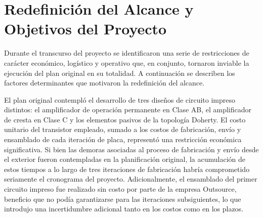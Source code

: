 \chapter{Redefinición del Alcance y Objetivos del Proyecto} \label{sec:alcance}
Durante el transcurso del proyecto se identificaron una serie de restricciones de carácter económico, logístico y operativo que, en conjunto, tornaron inviable la ejecución del plan original en su totalidad. A continuación se describen los factores determinantes que motivaron la redefinición del alcance.

El plan original contempló el desarrollo de tres diseños de circuito impreso distintos: el amplificador de operación permanente en Clase AB, el amplificador de cresta en Clase C y los elementos pasivos de la topología Doherty. El costo unitario del transistor empleado, sumado a los costos de fabricación, envío y ensamblado de cada iteración de placa, representó una restricción económica significativa. Si bien las demoras asociadas al proceso de fabricación y envío desde el exterior fueron contempladas en la planificación original, la acumulación de estos tiempos a lo largo de tres iteraciones de fabricación habría comprometido seriamente el cronograma del proyecto. Adicionalmente, el ensamblado del primer circuito impreso fue realizado sin costo por parte de la empresa Outsource, beneficio que no podía garantizarse para las iteraciones subsiguientes, lo que introdujo una incertidumbre adicional tanto en los costos como en los plazos.

